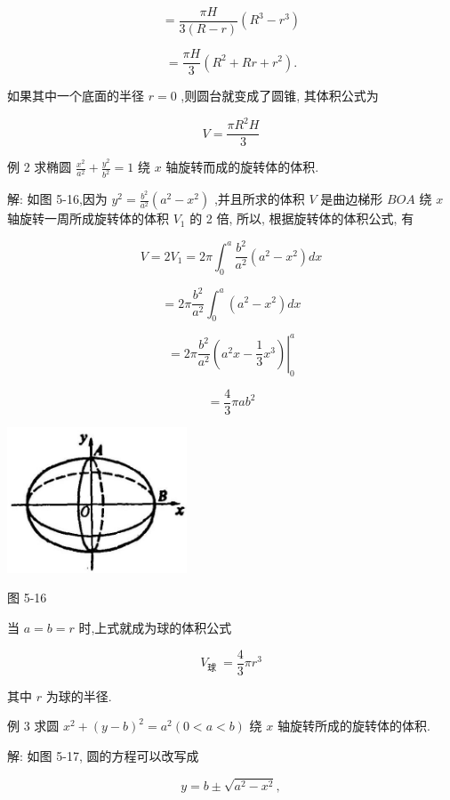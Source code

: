 \documentclass[lang=cn,newtx,10pt,scheme=chinese]{elegantbook}
\begin{document}
\[
= \frac{\pi H}{3\left( {R - r}\right) }\left( {{R}^{3} - {r}^{3}}\right)
\]

\[
= \frac{\pi H}{3}\left( {{R}^{2} + {Rr} + {r}^{2}}\right) \text{.}
\]

如果其中一个底面的半径 \(r = 0\) ,则圆台就变成了圆锥, 其体积公式为

\[
V = \frac{\pi {R}^{2}H}{3}
\]

例 2 求椭圆 \(\frac{{x}^{2}}{{a}^{2}} + \frac{{y}^{2}}{{b}^{2}} = 1\) 绕 \(x\) 轴旋转而成的旋转体的体积.

解: 如图 5-16,因为 \({y}^{2} = \frac{{b}^{2}}{{a}^{2}}\left( {{a}^{2} - {x}^{2}}\right)\) ,并且所求的体积 \(V\) 是曲边梯形 \({BOA}\) 绕 \(x\) 轴旋转一周所成旋转体的体积 \({V}_{1}\) 的 2 倍, 所以, 根据旋转体的体积公式, 有

\[
V = 2{V}_{1} = {2\pi }{\int }_{0}^{a}\frac{{b}^{2}}{{a}^{2}}\left( {{a}^{2} - {x}^{2}}\right) {dx}
\]

\[
= {2\pi }\frac{{b}^{2}}{{a}^{2}}{\int }_{0}^{a}\left( {{a}^{2} - {x}^{2}}\right) {dx}
\]

\[
= {\left. 2\pi \frac{{b}^{2}}{{a}^{2}}\left( {a}^{2}x - \frac{1}{3}{x}^{3}\right) \right| }_{0}^{a}
\]

\[
= \frac{4}{3}{\pi a}{b}^{2}
\]

\begin{center}
\includegraphics[max width=0.4\textwidth]{images/01912c18-5c3f-733d-b775-749ba9897a9d_238_905216.jpg}
\end{center}

图 5-16

当 \(a = b = r\) 时,上式就成为球的体积公式

\[
{V}_{\text{球 }} = \frac{4}{3}\pi {r}^{3}
\]

其中 \(r\) 为球的半径.

例 3 求圆 \({x}^{2} + {\left( y - b\right) }^{2} = {a}^{2}\left( {0 < a < b}\right)\) 绕 \(x\) 轴旋转所成的旋转体的体积.

解: 如图 5-17, 圆的方程可以改写成

\[
y = b \pm \sqrt{{a}^{2} - {x}^{2}},
\]
\end{document}
